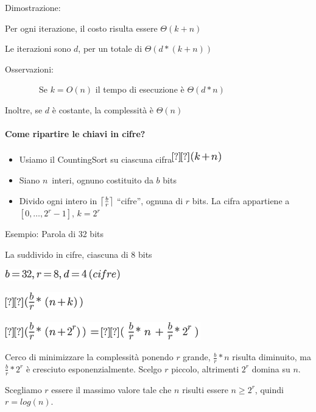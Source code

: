 \documentclass{article}
\DeclarePairedDelimiter\ceil{\lceil}{\rceil}
\providecommand{\tightlist}{%
  \setlength{\itemsep}{0pt}\setlength{\parskip}{0pt}}
\let\oldparagraph\paragraph
\renewcommand{\paragraph}[1]{\oldparagraph{#1}\mbox{}}
\begin{document}
{Dimostrazione:}

{Per ogni iterazione, il costo risulta essere $\Theta(k+n)$}

{Le iterazioni sono $d$, per un totale di $\Theta(d*(k+n))$}

{Osservazioni:}

{~~~~~~~~Se $k=O(n)$ il tempo di esecuzione è $\Theta(d*n)$}

{Inoltre, se $d$ è costante, la complessità è $\Theta(n)$}

\paragraph{Come ripartire le chiavi in cifre?}

\begin{itemize}
\tightlist
\item
  {Usiamo il CountingSort su ciascuna cifra}\includegraphics{images/image198.png}
\item
  {Siano }$n${~interi, ognuno costituito da $b$ bits}
\item
  {Divido ogni intero in $\ceil*{\frac{b}{r}}$ ``cifre'', ognuna di $r$ bits. La cifra appartiene a $[0,\ldots,2^r-1]$, $k=2^r$}
\end{itemize}

{Esempio: Parola di 32 bits}

{La suddivido in cifre, ciascuna di 8 bits}

\includegraphics{images/image204.png}

\includegraphics{images/image205.png}

\includegraphics{images/image206.png}

{Cerco di minimizzare la complessità ponendo $r$ grande, $\frac{b}{r}*n$ risulta diminuito, ma $\frac{b}{r}*2^r$ è cresciuto esponenzialmente. Scelgo $r$ piccolo, altrimenti $2^r$ domina su $n$.}

{Scegliamo $r$ essere il massimo valore tale che $n$ risulti essere $n\geq 2^r$, quindi $r=log(n)$.}
\end{document}
